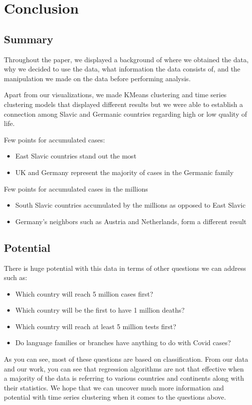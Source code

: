 \documentclass[conference]{IEEEtran}
\begin{document}
\section{Conclusion}

\subsection{Summary}

Throughout the paper, we displayed a background of where we obtained the data, why we decided to use the data, what information the data consists of, and the manipulation we made on the data before performing analysis. 

Apart from our visualizations, we made KMeans clustering and time series clustering models that displayed different results but we were able to establish a connection among Slavic and Germanic countries regarding high or low quality of life.

Few points for accumulated cases:

\begin{itemize}
\item East Slavic countries stand out the most
\item UK and Germany represent the majority of cases in the Germanic family
\end{itemize}

Few points for accumulated cases in the millions

\begin{itemize}
\item South Slavic countries accumulated by the millions as opposed to East Slavic
\item Germany's neighbors such as Austria and Netherlands, form a different result
\end{itemize}

\subsection{Potential}

There is huge potential with this data in terms of other questions we can address such as:
\begin{itemize}
\item Which country will reach 5 million cases first?
\item Which country will be the first to have 1 million deaths?
\item Which country will reach at least 5 million tests first?
\item Do language families or branches have anything to do with Covid cases?
\end{itemize}
As you can see, most of these questions are based on classification. From our data and our work, you can see that regression algorithms are not that effective when a majority of the data is referring to various countries and continents along with their statistics.
We hope that we can uncover much more information and potential with time series clustering when it comes to the questions above.
\end{document}
